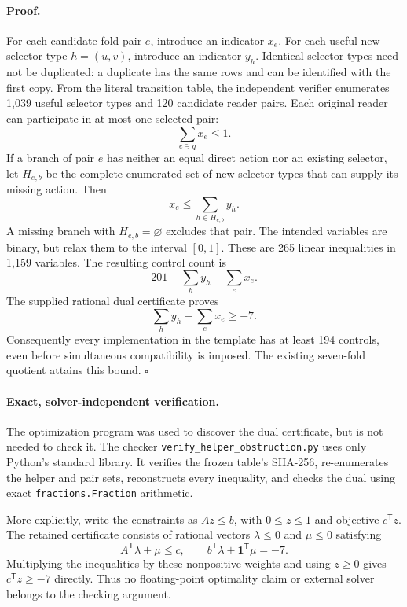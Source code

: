 \paragraph{Proof.}
For each candidate fold pair $e$, introduce an indicator $x_e$. For each
useful new selector type $h=(u,v)$, introduce an indicator $y_h$. Identical
selector types need not be duplicated: a duplicate has the same rows and
can be identified with the first copy. From the literal transition table,
the independent verifier enumerates 1,039 useful selector types and 120
candidate reader pairs. Each original reader can participate in at most
one selected pair:
\[
                  \sum_{e\ni q}x_e\leq 1.
\]
If a branch of pair $e$ has neither an equal direct action nor an existing
selector, let $H_{e,b}$ be the complete enumerated set of new selector
types that can supply its missing action. Then
\[
                  x_e\leq\sum_{h\in H_{e,b}}y_h.
\]
A missing branch with $H_{e,b}=\varnothing$ excludes that pair. The intended
variables are binary, but relax them to the interval $[0,1]$. These are
265 linear inequalities in 1,159 variables. The resulting control count is
\[
                 201+\sum_h y_h-\sum_e x_e.
\]
The supplied rational dual certificate proves
\[
                  \sum_hy_h-\sum_ex_e\geq -7.
\]
Consequently every implementation in the template has at least 194
controls, even before simultaneous compatibility is imposed. The existing
seven-fold quotient attains this bound. \hfill$\square$

\paragraph{Exact, solver-independent verification.}
The optimization program was used to discover the dual certificate, but
is not needed to check it. The checker
\texttt{verify\_helper\_obstruction.py} uses only Python's standard library.
It verifies the frozen table's SHA-256, re-enumerates the helper and pair
sets, reconstructs every inequality, and checks the dual using exact
\texttt{fractions.Fraction} arithmetic.

More explicitly, write the constraints as $Az\leq b$, with $0\leq z\leq1$
and objective $c^{\mathsf T}z$. The retained certificate consists of rational
vectors $\lambda\leq0$ and $\mu\leq0$ satisfying
\[
       A^{\mathsf T}\lambda+\mu\leq c,
       \qquad b^{\mathsf T}\lambda+\mathbf1^{\mathsf T}\mu=-7.
\]
Multiplying the inequalities by these nonpositive weights and using
$z\geq0$ gives $c^{\mathsf T}z\geq-7$ directly. Thus no floating-point
optimality claim or external solver belongs to the checking argument.

